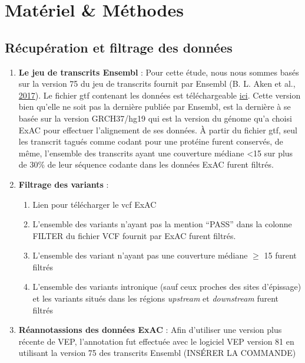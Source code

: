 \documentclass[12pt,twoside]{reedthesis}
\providecommand{\tightlist}{%
  \setlength{\itemsep}{0pt}\setlength{\parskip}{0pt}}
\theoremstyle{definition}
\theoremstyle{definition}
\theoremstyle{remark}
\begin{document}
  \section{Matériel \& Méthodes}\label{materiel-methodes}
  
  \subsection{Récupération et filtrage des
  données}\label{recuperation-et-filtrage-des-donnees}
  
  \begin{enumerate}
  \def\labelenumi{\arabic{enumi}.}
  \tightlist
  \item
    \textbf{Le jeu de transcrits Ensembl} : Pour cette étude, nous nous
    sommes basés sur la version 75 du jeu de transcrits fournit par
    Ensembl (B. L. Aken et al., \protect\hyperlink{ref-Aken2017}{2017}).
    Le fichier gtf contenant les données est téléchargeable
    \href{insérer\%20liens\%20vers\%20gtf}{ici}. Cette version bien
    qu'elle ne soit pas la dernière publiée par Ensembl, est la dernière à
    se basée sur la version GRCH37/hg19 qui est la version du génome qu'a
    choisi ExAC pour effectuer l'alignement de ses données. À partir du
    fichier gtf, seul les transcrit tagués comme codant pour une protéine
    furent conservés, de même, l'ensemble des transcrits ayant une
    couverture médiane \textless{}15 sur plus de 30\% de leur séquence
    codante dans les données ExAC furent filtrés.\\
  \item
    \textbf{Filtrage des variants} :
  
    \begin{enumerate}
    \def\labelenumii{\alph{enumii}.}
    \tightlist
    \item
      Lien pour télécharger le vcf ExAC\\
    \item
      L'ensemble des variants n'ayant pas la mention ``PASS'' dans la
      colonne FILTER du fichier VCF fournit par ExAC furent filtrés.\\
    \item
      L'ensemble des variant n'ayant pas une couverture médiane \(\ge\) 15
      furent filtrés\\
    \item
      L'ensemble des variants intronique (sauf ceux proches des sites
      d'épissage) et les variants situés dans les régions \emph{upstream}
      et \emph{downstream} furent filtrés\\
    \end{enumerate}
  \item
    \textbf{Réannotassions des données ExAC} : Afin d'utiliser une version
    plus récente de VEP, l'annotation fut effectuée avec le logiciel VEP
    version 81 en utilisant la version 75 des transcrits Ensembl (INSÉRER
    LA COMMANDE)
  \end{enumerate}
  
\end{document}
